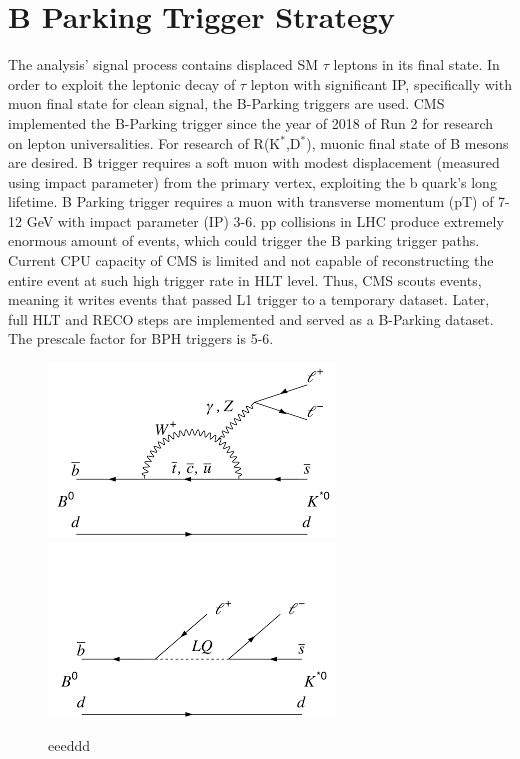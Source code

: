 \clearpage
\chapter{B Parking Trigger Strategy}\label{sec:triggers}

The analysis' signal process contains displaced SM $\tau$ leptons in its final state. 
In order to exploit the leptonic decay of $\tau$ lepton with significant IP, specifically with muon final state for clean signal, the B-Parking triggers are used. 
CMS implemented the B-Parking trigger since the year of 2018 of Run 2 for research on lepton universalities. 
For research of R(K$^{*}$,D$^{*}$), muonic final state of B mesons are desired. 
B trigger requires a soft muon with modest displacement (measured using impact parameter) from the primary vertex, exploiting the b quark's long lifetime.
B Parking trigger requires a muon with transverse momentum (pT) of 7-12 GeV with impact parameter (IP) 3-6.
pp collisions in LHC produce extremely enormous amount of events, which could trigger the B parking trigger paths. 
Current CPU capacity of CMS is limited and not capable of reconstructing the entire event at such high trigger rate in HLT level.
Thus, CMS scouts events, meaning it writes events that passed L1 trigger to a temporary dataset. Later, full HLT and RECO steps are implemented and served as a B-Parking dataset. 
The prescale factor for BPH triggers is 5-6.
\begin{figure}[h!]
  \caption{eeeddd}
  \label{fig:Lepton}
  \centering
  \includegraphics[width=0.57\linewidth]{figs/LU1.png}
  \includegraphics[width=0.57\linewidth]{figs/LU2.png}

\end{figure}


